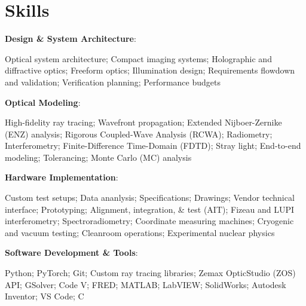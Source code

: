 \documentclass[letterpaper,11pt]{article}
\begin{document}
\section{Skills}
\begin{itemize}[leftmargin=0.15in, label={}]
    \small{
        \item\begin{minipage}[t]{\linewidth}
            \textbf{Design \& System Architecture}: \hangindent=25pt  \raggedright Optical system architecture; Compact imaging systems; Holographic and diffractive optics; Freeform optics; Illumination design; Requirements flowdown and validation; Verification planning; Performance budgets
        \end{minipage}
        \item\begin{minipage}[t]{\linewidth}
            \textbf{Optical Modeling}: \hangindent=25pt  \raggedright High-fidelity ray tracing; Wavefront propagation; Extended Nijboer-Zernike (ENZ) analysis; Rigorous Coupled-Wave Analysis (RCWA); Radiometry; Interferometry; Finite-Difference Time-Domain (FDTD); Stray light; End-to-end modeling; Tolerancing; Monte Carlo (MC) analysis
        \end{minipage}
        \item\begin{minipage}[t]{\linewidth}
            \textbf{Hardware Implementation}: \hangindent=25pt  \raggedright Custom test setups; Data ananlysis; Specifications; Drawings; Vendor technical interface; Prototyping; Alignment, integration, \& test (AIT); Fizeau and LUPI interferometry; Spectroradiometry; Coordinate measuring machines; Cryogenic and vacuum testing; Cleanroom operations; Experimental nuclear physics
        \end{minipage}
        \item\begin{minipage}[t]{\linewidth}
            \textbf{Software Development \& Tools}: \hangindent=25pt  \raggedright Python; PyTorch; Git; Custom ray tracing libraries; Zemax OpticStudio (ZOS) API; GSolver; Code V; FRED; MATLAB; LabVIEW; SolidWorks; Autodesk Inventor; VS Code; C
        \end{minipage}
    }
\end{itemize}


\end{document}
